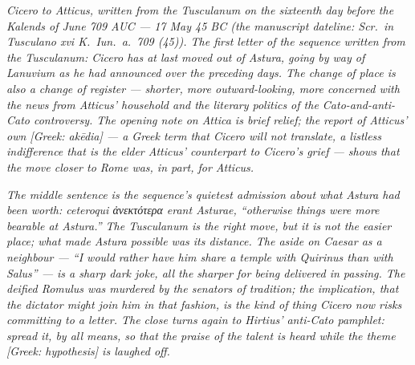 
\textit{Cicero to Atticus, written from the
Tusculanum on the sixteenth day before the Kalends
of June 709 AUC --- 17 May 45 BC (the manuscript
dateline: \textit{Scr.\ in Tusculano xvi K.\ Iun.\
a.\ 709 (45)}). The first letter of the sequence
written from the Tusculanum: Cicero has at last
moved out of Astura, going by way of Lanuvium as he
had announced over the preceding days. The change
of place is also a change of register --- shorter,
more outward-looking, more concerned with the news
from Atticus' household and the literary politics
of the Cato-and-anti-Cato controversy. The opening
note on Attica is brief relief; the report of
Atticus' own \textit{[Greek: ak\=edia]} --- a Greek
term that Cicero will not translate, a listless
indifference that is the elder Atticus' counterpart
to Cicero's grief --- shows that the move closer to
Rome was, in part, for Atticus.}

\textit{The middle sentence is the sequence's
quietest admission about what Astura had been worth:
\textit{ceteroqui ἀνεκτότερα erant Asturae},
``otherwise things were more bearable at Astura.''
The Tusculanum is the right move, but it is not the
easier place; what made Astura possible was its
distance. The aside on Caesar as a neighbour ---
``I would rather have him share a temple with
Quirinus than with Salus'' --- is a sharp dark joke,
all the sharper for being delivered in passing. The
deified Romulus was murdered by the senators of
tradition; the implication, that the dictator might
join him in that fashion, is the kind of thing
Cicero now risks committing to a letter. The close
turns again to Hirtius' anti-Cato pamphlet: spread
it, by all means, so that the praise of the talent
is heard while the theme \textit{[Greek: hypothesis]}
is laughed off.}
